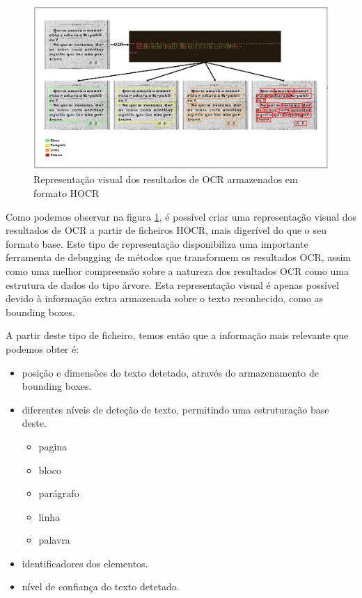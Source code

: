 \begin{figure}[H]
	\centering
	\includegraphics[width=1\textwidth]{images/ilustracoes/hocr_visual_representation.png}
	\caption{Representação visual dos resultados de OCR armazenados em formato HOCR}
	\label{fig:hocr_visual_representation}
\end{figure}


Como podemos observar na figura \ref{fig:hocr_visual_representation}, é possível criar uma representação visual dos resultados de OCR a partir de ficheiros HOCR, mais digerível do que o seu formato base. Este tipo de representação disponibiliza uma importante ferramenta de debugging de métodos que transformem os resultados OCR, assim como uma melhor compreensão sobre a natureza dos resultados OCR como uma estrutura de dados do tipo árvore. Esta representação visual é apenas possível devido à informação extra armazenada sobre o texto reconhecido, como as bounding boxes.

A partir deste tipo de ficheiro, temos então que a informação mais relevante que podemos obter é:

\begin{itemize}\setlength\itemsep{-0.8em}
	\item posição e dimensões do texto detetado, através do armazenamento de bounding boxes.
	\item diferentes níveis de deteção de texto, permitindo uma estruturação base deste.
		\begin{itemize}\setlength\itemsep{-0.8em}
			\item pagina
			\item bloco
			\item parágrafo
			\item linha
			\item palavra
		\end{itemize}
	\item identificadores dos elementos.
	\item nível de confiança do texto detetado.
\end{itemize}

